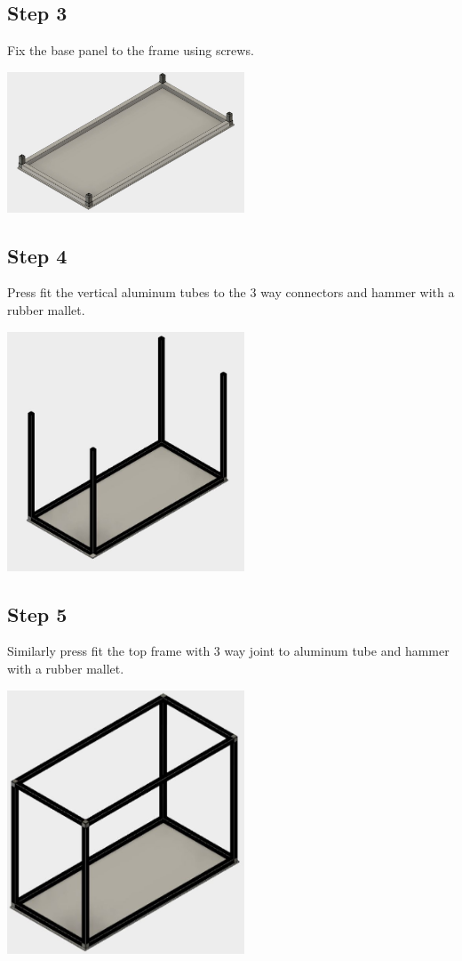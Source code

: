 \documentclass[a4paper,12pt,oneside]{book}
\begin{document}
\subsection*{Step 3}
Fix the base panel to the frame using screws.\\
\begin{center}
  \includegraphics[width=200pt]{3}
  \end{center}
\subsection*{Step 4}
Press fit the vertical aluminum tubes to the 3 way connectors and hammer with a rubber mallet.\\
\begin{center}
  \includegraphics[width=200pt]{4}
  \end{center}
\subsection*{Step 5}
Similarly press fit the top frame with 3 way joint to aluminum tube and hammer with a rubber mallet.\\
\begin{center}
  \includegraphics[width=200pt]{5}
  \end{center}
\end{document}

